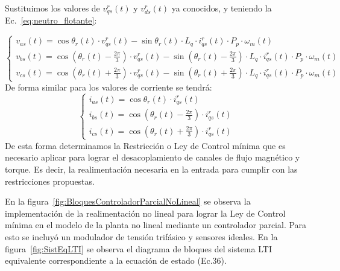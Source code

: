 \documentclass{article}
\begin{document}
Sustituimos los valores de $v^r_{qs}(t)$ y $v^r_{ds}(t)$ ya conocidos, y teniendo la Ec.~\ref{eq:neutro_flotante}:

\begin{equation}
\begin{cases}
v_{as}(t) = \cos \theta_r(t)\cdot v^r_{qs}(t) - \sin \theta_r(t)\cdot L_q\cdot i^r_{qs}(t)\cdot P_p\cdot\omega_m(t) \\
v_{bs}(t) = \cos\left(\theta_r(t)-\frac{2\pi}{3}\right)\cdot v^r_{qs}(t) - \sin\left(\theta_r(t)-\frac{2\pi}{3}\right)\cdot L_q\cdot i^r_{qs}(t)\cdot P_p\cdot\omega_m(t) \\
v_{cs}(t) = \cos\left(\theta_r(t)+\frac{2\pi}{3}\right)\cdot v^r_{qs}(t) - \sin\left(\theta_r(t)+\frac{2\pi}{3}\right)\cdot L_q\cdot i^r_{qs}(t)\cdot P_p\cdot\omega_m(t)
\end{cases}
\end{equation}
De forma similar para los valores de corriente se tendrá:
\begin{equation}
\begin{cases}
i_{as}(t) = \cos \theta_r(t)\cdot i^r_{qs}(t)  \\
i_{bs}(t) = \cos\left(\theta_r(t)-\frac{2\pi}{3}\right)\cdot i^r_{qs}(t) \\
i_{cs}(t) = \cos\left(\theta_r(t)+\frac{2\pi}{3}\right)\cdot i^r_{qs}(t)
\end{cases}
\end{equation}
De esta forma determinamos la Restricción o Ley de Control mínima que es necesario aplicar para lograr el desacoplamiento de canales de flujo magnético y torque. Es decir, la realimentación necesaria en la entrada para cumplir con las restricciones propuestas.

En la figura~\ref{fig:BloquesControladorParcialNoLineal} se observa la implementación de
la realimentación no lineal para lograr la Ley de Control mínima en el modelo de la planta no lineal mediante un controlador parcial. Para esto se incluyó un modulador de tensión trifásico y sensores ideales. En la figura~\ref{fig:SistEqLTI} se observa el diagrama de bloques del sistema LTI equivalente correspondiente a la ecuación de estado (Ec.36).
\end{document}
